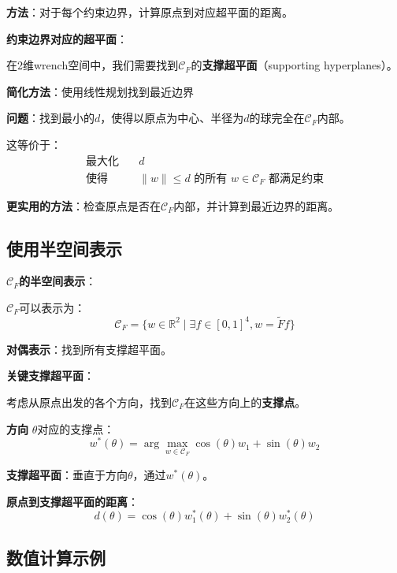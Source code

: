 \documentclass[12pt,a4paper]{article}
\begin{document}
\textbf{方法}：对于每个约束边界，计算原点到对应超平面的距离。

\textbf{约束边界对应的超平面}：

在2维wrench空间中，我们需要找到$\mathcal{C}_F$的\textbf{支撑超平面}（supporting hyperplanes）。

\textbf{简化方法}：使用线性规划找到最近边界

\textbf{问题}：找到最小的$d$，使得以原点为中心、半径为$d$的球完全在$\mathcal{C}_F$内部。

这等价于：
\begin{align}
\text{最大化} \quad & d \\
\text{使得} \quad & \|w\| \leq d \text{ 的所有 } w \in \mathcal{C}_F \text{ 都满足约束}
\end{align}

\textbf{更实用的方法}：检查原点是否在$\mathcal{C}_F$内部，并计算到最近边界的距离。

\subsection{使用半空间表示}

\textbf{$\mathcal{C}_F$的半空间表示}：

$\mathcal{C}_F$可以表示为：
\begin{equation}
\mathcal{C}_F = \{w \in \mathbb{R}^2 \mid \exists f \in [0,1]^4, w = \tilde{F} f\}
\end{equation}

\textbf{对偶表示}：找到所有支撑超平面。

\textbf{关键支撑超平面}：

考虑从原点出发的各个方向，找到$\mathcal{C}_F$在这些方向上的\textbf{支撑点}。

\textbf{方向} $\theta$对应的支撑点：
\begin{equation}
w^*(\theta) = \arg\max_{w \in \mathcal{C}_F} \cos(\theta) w_1 + \sin(\theta) w_2
\end{equation}

\textbf{支撑超平面}：垂直于方向$\theta$，通过$w^*(\theta)$。

\textbf{原点到支撑超平面的距离}：
\begin{equation}
d(\theta) = \cos(\theta) w_1^*(\theta) + \sin(\theta) w_2^*(\theta)
\end{equation}

\subsection{数值计算示例}
\end{document}
